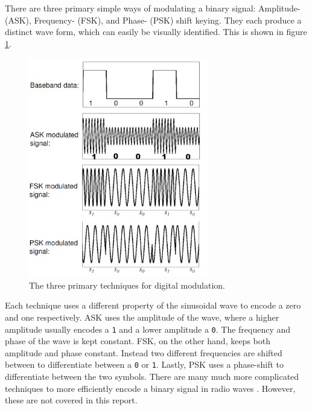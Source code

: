 There are three primary simple ways of modulating a binary signal: Amplitude- (ASK), Frequency- (FSK), and Phase- (PSK) shift keying. They each produce a distinct wave form, which can easily be visually identified. This is shown in figure \ref{fig:digital-modulation}.
\begin{figure}[!ht]
    \centering
    \includegraphics[width=0.7\textwidth]{images/6-pentesting/digital-modulation.png}
    \caption{The three primary techniques for digital modulation.}
    \label{fig:digital-modulation}
\end{figure}
Each technique uses a different property of the sinusoidal wave to encode a zero and one respectively. \gls{ASK} uses the amplitude of the wave, where a higher amplitude usually encodes a \texttt{1} and a lower amplitude a \texttt{0}. The frequency and phase of the wave is kept constant. \gls{FSK}, on the other hand, keeps both amplitude and phase constant. Instead two different frequencies are shifted between to differentiate between a \texttt{0} or \texttt{1}. Lastly, \gls{PSK} uses a phase-shift to differentiate between the two symbols. There are many much more complicated techniques to more efficiently encode a binary signal in radio waves \cite{rf-modulation}. However, these are not covered in this report.

